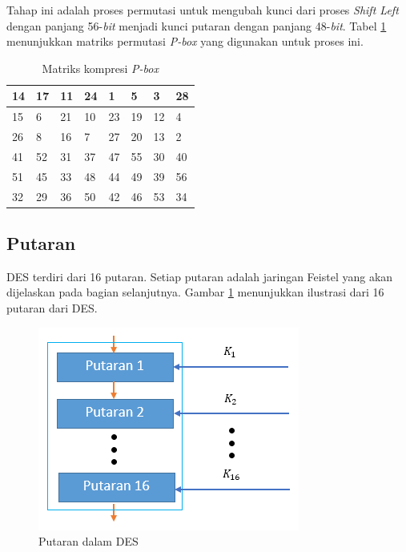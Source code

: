 Tahap ini adalah proses permutasi untuk mengubah kunci dari proses \textit{Shift Left} dengan panjang 56-\textit{bit} menjadi kunci putaran dengan panjang 48-\textit{bit}. Tabel \ref{table:kompresi_p} menunjukkan matriks permutasi\textit{ P-box} yang digunakan untuk proses ini.

\begin{table}[H]
	\begin{center}
		\caption{Matriks kompresi \textit{P-box}}\label{table:kompresi_p}
		\begin{tabular}{|l|l|l|l|l|l|l|l|}
				\hline
				14	&	17	&	11	&	24	&	1	&	5	&	3	&	28	\\ \hline
				15	&	6	&	21	&	10	&	23	&	19	&	12	&	4	\\ \hline
				26	&	8	&	16	&	7	&	27	&	20	&	13	&	2	\\ \hline
				41	&	52	&	31	&	37	&	47	&	55	&	30	&	40	\\ \hline
				51	&	45	&	33	&	48	&	44	&	49	&	39	&	56	\\ \hline
				32	&	29	&	36	&	50	&	42	&	46	&	53	&	34	\\ \hline
		\end{tabular}
	\end{center}
\end{table}

\subsection{Putaran}

DES terdiri dari 16 putaran. Setiap putaran adalah jaringan Feistel yang akan dijelaskan pada bagian selanjutnya. Gambar \ref{fig:putarandes} menunjukkan ilustrasi dari 16 putaran dari DES.

\begin{figure}[H]
	\includegraphics[scale=0.8]{Gambar/putaran_des}
	\centering
	\caption{Putaran dalam DES}\label{fig:putarandes}
\end{figure}

